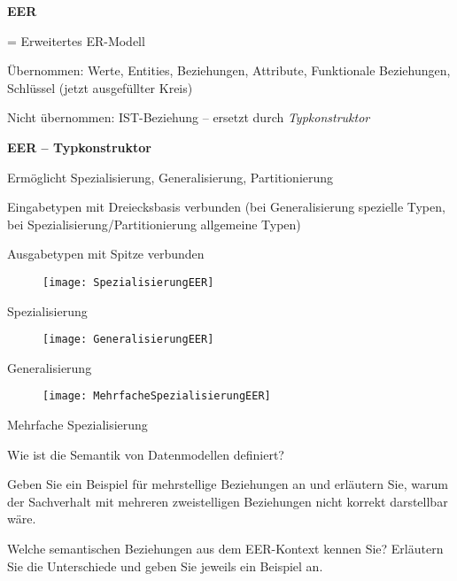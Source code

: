 \textbf{EER}
\begin{items}
	\item = Erweitertes ER-Modell
	\item Übernommen: Werte, Entities, Beziehungen, Attribute, Funktionale Beziehungen, Schlüssel (jetzt ausgefüllter Kreis)
	\item Nicht übernommen: IST-Beziehung -- ersetzt durch \emph{Typkonstruktor}
\end{items}

\textbf{EER -- Typkonstruktor}
\begin{items}
	\item Ermöglicht Spezialisierung, Generalisierung, Partitionierung
	\item Eingabetypen mit Dreiecksbasis verbunden (bei Generalisierung spezielle Typen, bei Spezialisierung/Partitionierung allgemeine Typen)
	\item Ausgabetypen mit Spitze verbunden
\end{items}
\begin{center}
	\begin{figure}[H]\centering\label{SpezialisierungEER}\texttt{[image: SpezialisierungEER]}\end{figure}
	Spezialisierung
	\begin{figure}[H]\centering\label{GeneralisierungEER}\texttt{[image: GeneralisierungEER]}\end{figure}
	Generalisierung
	\begin{figure}[H]\centering\label{MehrfacheSpezialisierungEER}\texttt{[image: MehrfacheSpezialisierungEER]}\end{figure}
	Mehrfache Spezialisierung
\end{center}

\begin{fragen}
	\begin{enumeration}
		\item Wie ist die Semantik von Datenmodellen definiert?
		\item Geben Sie ein Beispiel für mehrstellige Beziehungen an und erläutern Sie, warum der Sachverhalt mit mehreren zweistelligen Beziehungen nicht korrekt darstellbar wäre.
		\item Welche semantischen Beziehungen aus dem EER-Kontext kennen Sie? Erläutern Sie die Unterschiede und geben Sie jeweils ein Beispiel an.
	\end{enumeration}
\end{fragen}

